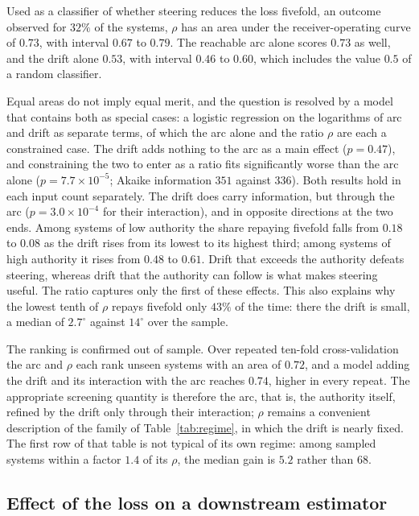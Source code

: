 \documentclass[12pt]{article}
\begin{document}
Used as a classifier of whether steering reduces the loss fivefold, an
outcome observed for $32\%$ of the systems, $\rho$ has an area under the receiver-operating curve
of $0.73$, with interval $0.67$ to $0.79$. The reachable arc alone scores
$0.73$ as well, and the drift alone $0.53$, with interval $0.46$ to $0.60$,
which includes the value $0.5$ of a random classifier.

Equal areas do not imply equal merit, and the question is resolved by a
model that contains both as special cases: a logistic regression on the
logarithms of arc and drift as separate terms, of which the arc alone and the
ratio $\rho$ are each a constrained case. The drift adds nothing to the arc as
a main effect ($p=0.47$), and constraining the two to enter as a ratio fits
significantly worse than the arc alone ($p=7.7\times10^{-5}$; Akaike
information $351$ against $336$). Both results hold in each input count
separately. The drift does carry information, but through the arc
($p=3.0\times10^{-4}$ for their interaction), and in opposite directions at the
two ends. Among systems of low authority the share repaying fivefold falls from
$0.18$ to $0.08$ as the drift rises from its lowest to its highest third; among
systems of high authority it rises from $0.48$ to $0.61$. Drift that exceeds
the authority defeats steering, whereas drift that the authority can follow
is what makes steering useful. The ratio captures only the first of these
effects. This also explains why the lowest tenth of $\rho$ repays fivefold only $43\%$ of the time:
there the drift is small, a median of $2.7^{\circ}$ against $14^{\circ}$ over
the sample.

The ranking is confirmed out of sample. Over repeated ten-fold
cross-validation the arc and $\rho$ each rank unseen systems with an area of $0.72$, and a model
adding the drift and its interaction with the arc reaches $0.74$, higher in
every repeat. The appropriate screening quantity is therefore the arc, that
is, the authority itself, refined by the drift only through their
interaction; $\rho$ remains a convenient description of the family of
Table~\ref{tab:regime}, in which the drift is nearly fixed. The first row of
that table is not typical of its own regime: among sampled systems within a
factor $1.4$ of its $\rho$, the median gain is
$5.2$ rather than $68$.

\subsection{Effect of the loss on a downstream estimator}
\label{sec:downstream}
\end{document}
